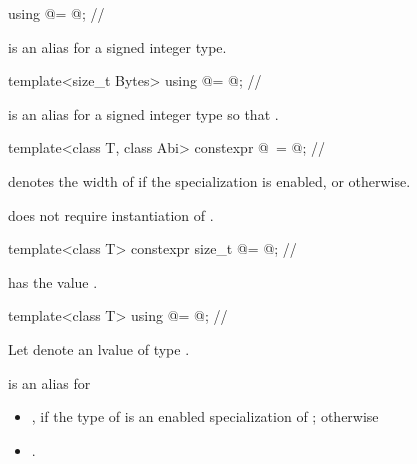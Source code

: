 \begin{itemdecl}
using @\simdsizetype@ = @\seebelow@; // \expos
\end{itemdecl}
\begin{itemdescr}
  \pnum
  \simdsizetype{} is an alias for a signed integer type.
\end{itemdescr}

\begin{itemdecl}
template<size_t Bytes> using @\integerfrom@ = @\seebelow@; // \expos
\end{itemdecl}
\begin{itemdescr}
  \pnum
   is an alias for a signed integer type  so that
  .
\end{itemdescr}

\begin{itemdecl}
template<class T, class Abi>
  constexpr @\simdsizetype\ \simdsizev@ = @\seebelow@; // \expos
\end{itemdecl}
\begin{itemdescr}
  \pnum
   denotes the width of  if
  the specialization  is enabled, or  otherwise.
  \begin{note}
     does not require instantiation of .
  \end{note}
\end{itemdescr}

\begin{itemdecl}
template<class T> constexpr size_t @\maskelementsize@ = @\seebelow@; // \expos
\end{itemdecl}
\begin{itemdescr}
  \pnum
   has the value .
\end{itemdescr}

\begin{itemdecl}
template<class T> using @\deducedsimd@ = @\seebelow@; // \expos
\end{itemdecl}
\begin{itemdescr}
  \pnum Let  denote an lvalue of type .

  \pnum {} is an alias for
  \begin{itemize}

    \item {},
      if the type of  is an enabled specialization of ;
      otherwise

    \item {}.
  \end{itemize}
\end{itemdescr}


